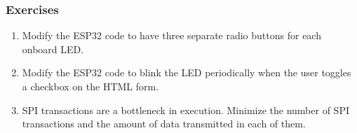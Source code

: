 \subsubsection{Exercises}
\begin{enumerate}
    \item Modify the ESP32 code to have three separate radio buttons for each
    onboard LED.
    \item Modify the ESP32 code to blink the LED periodically when the user
    toggles a checkbox on the HTML form.
    \item SPI transactions are a bottleneck in execution. Minimize the number of
    SPI transactions and the amount of data transmitted in each of them.
\end{enumerate}